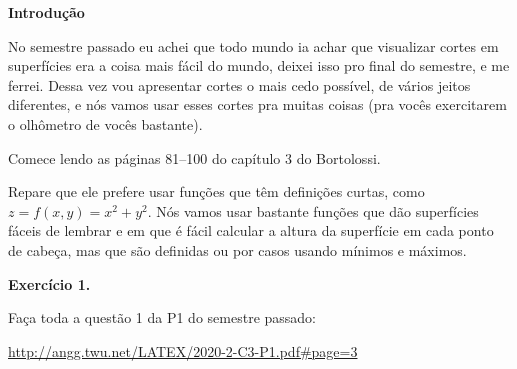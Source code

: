 \documentclass[oneside,12pt]{article}
\begin{document}
\newpage

{\bf Introdução}

No semestre passado eu achei que todo mundo ia achar que visualizar
cortes em superfícies era a coisa mais fácil do mundo, deixei isso pro
final do semestre, e me ferrei. Dessa vez vou apresentar cortes o mais
cedo possível, de vários jeitos diferentes, e nós vamos usar esses
cortes pra muitas coisas (pra vocês exercitarem o olhômetro de vocês
bastante).

Comece lendo as páginas 81--100 do capítulo 3 do Bortolossi.

Repare que ele prefere usar funções que têm definições curtas, como $z
= f(x,y) = x^2 + y^2$. Nós vamos usar bastante funções que dão
superfícies fáceis de lembrar e em que é fácil calcular a altura da
superfície em cada ponto de cabeça, mas que são definidas ou por casos
usando mínimos e máximos.

\newpage

{\bf Exercício 1.}


Faça toda a questão 1 da P1 do semestre passado:

{\footnotesize

\url{http://angg.twu.net/LATEX/2020-2-C3-P1.pdf\#page=3}

}







\end{document}
